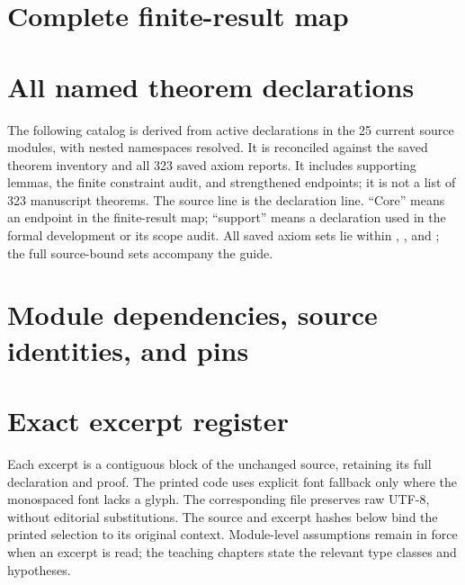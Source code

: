 \tableofcontents\clearpage

\clearpage
\clearpage
\clearpage
\clearpage
\clearpage
\clearpage
\clearpage
\clearpage\section{Complete finite-result map}\label{sec:scope}

\clearpage\section{All named theorem declarations}\label{sec:catalog}
The following catalog is derived from active declarations in the 25 current source modules, with nested namespaces resolved. It is reconciled against the saved theorem inventory and all 323 saved axiom reports. It includes supporting lemmas, the finite constraint audit, and strengthened endpoints; it is not a list of 323 manuscript theorems. The source line is the declaration line. ``Core'' means an endpoint in the finite-result map; ``support'' means a declaration used in the formal development or its scope audit. All saved axiom sets lie within , , and ; the full source-bound sets accompany the guide.

\clearpage\section{Module dependencies, source identities, and pins}\label{sec:dependencies}

\clearpage\section{Exact excerpt register}\label{sec:excerpts}
Each excerpt is a contiguous block of the unchanged source, retaining its full declaration and proof. The printed code uses explicit font fallback only where the monospaced font lacks a glyph. The corresponding  file preserves raw UTF-8, without editorial substitutions. The source and excerpt hashes below bind the printed selection to its original context. Module-level assumptions remain in force when an excerpt is read; the teaching chapters state the relevant type classes and hypotheses.


